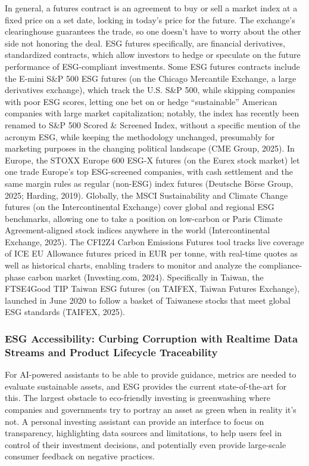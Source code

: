 \documentclass[
  12pt,
  letterpaper,
  DIV=11,
  numbers=noendperiod]{scrartcl}
\begin{document}
In general, a futures contract is an agreement to buy or sell a market
index at a fixed price on a set date, locking in today's price for the
future. The exchange's clearinghouse guarantees the trade, so one
doesn't have to worry about the other side not honoring the deal. ESG
futures specifically, are financial derivatives, standardized contracts,
which allow investors to hedge or speculate on the future performance of
ESG-compliant investments. Some ESG futures contracts include the E-mini
S\&P 500 ESG futures (on the Chicago Mercantile Exchange, a large
derivatives exchange), which track the U.S. S\&P 500, while skipping
companies with poor ESG scores, letting one bet on or hedge
``sustainable'' American companies with large market capitalization;
notably, the index has recently been renamed to S\&P 500 Scored \&
Screened Index, without a specific mention of the acronym ESG, while
keeping the methodology unchanged, presumably for marketing purposes in
the changing political landscape (CME Group, 2025). In Europe, the STOXX
Europe 600 ESG-X futures (on the Eurex stock market) let one trade
Europe's top ESG-screened companies, with cash settlement and the same
margin rules as regular (non-ESG) index futures (Deutsche Börse Group,
2025; Harding, 2019). Globally, the MSCI Sustainability and Climate
Change futures (on the Intercontinental Exchange) cover global and
regional ESG benchmarks, allowing one to take a position on low-carbon
or Paris Climate Agreement-aligned stock indices anywhere in the world
(Intercontinental Exchange, 2025). The CFI2Z4 Carbon Emissions Futures
tool tracks live coverage of ICE EU Allowance futures priced in EUR per
tonne, with real-time quotes as well as historical charts, enabling
traders to monitor and analyze the compliance-phase carbon market
(Investing.com, 2024). Specifically in Taiwan, the FTSE4Good TIP Taiwan
ESG futures (on TAIFEX, Taiwan Futures Exchange), launched in June 2020
to follow a basket of Taiwanese stocks that meet global ESG standards
(TAIFEX, 2025).

\subsubsection{ESG Accessibility: Curbing Corruption with Realtime Data
Streams and Product Lifecycle
Traceability}\label{esg-accessibility-curbing-corruption-with-realtime-data-streams-and-product-lifecycle-traceability}

For AI-powered assistants to be able to provide guidance, metrics are
needed to evaluate sustainable assets, and ESG provides the current
state-of-the-art for this. The largest obstacle to eco-friendly
investing is greenwashing where companies and governments try to portray
an asset as green when in reality it's not. A personal investing
assistant can provide an interface to focus on transparency,
highlighting data sources and limitations, to help users feel in control
of their investment decisions, and potentially even provide large-scale
consumer feedback on negative practices.
\end{document}
